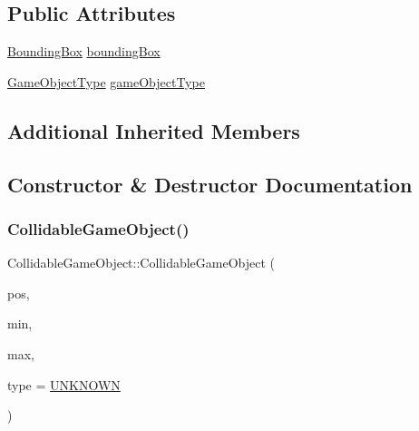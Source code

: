 \subsection*{Public Attributes}
\begin{DoxyCompactItemize}
\item 
\hyperlink{class_bounding_box}{Bounding\+Box} \hyperlink{class_collidable_game_object_a19d723799fa054bf174be196541c5f57}{bounding\+Box}
\item 
\hyperlink{_game_object_8h_a57678b60d65afb213d04a6b090c64a08}{Game\+Object\+Type} \hyperlink{class_collidable_game_object_a5c79dc25d987f169a79c2c161e1a79dd}{game\+Object\+Type}
\end{DoxyCompactItemize}
\subsection*{Additional Inherited Members}


\subsection{Constructor \& Destructor Documentation}
\mbox{\label{class_collidable_game_object_af19a7e3e12239a38cbc076eeafcafff6}} 
\subsubsection{\texorpdfstring{Collidable\+Game\+Object()}{CollidableGameObject()}}
{\footnotesize\ttfamily Collidable\+Game\+Object\+::\+Collidable\+Game\+Object (\begin{DoxyParamCaption}\item[{\hyperlink{class_vector3}{Vector3}}]{pos,  }\item[{\hyperlink{class_vector3}{Vector3}}]{min,  }\item[{\hyperlink{class_vector3}{Vector3}}]{max,  }\item[{\hyperlink{_game_object_8h_a57678b60d65afb213d04a6b090c64a08}{Game\+Object\+Type}}]{type = {\ttfamily \hyperlink{_game_object_8h_a57678b60d65afb213d04a6b090c64a08a6ce26a62afab55d7606ad4e92428b30c}{U\+N\+K\+N\+O\+WN}} }\end{DoxyParamCaption})\hspace{0.3cm}{\ttfamily [inline]}}



